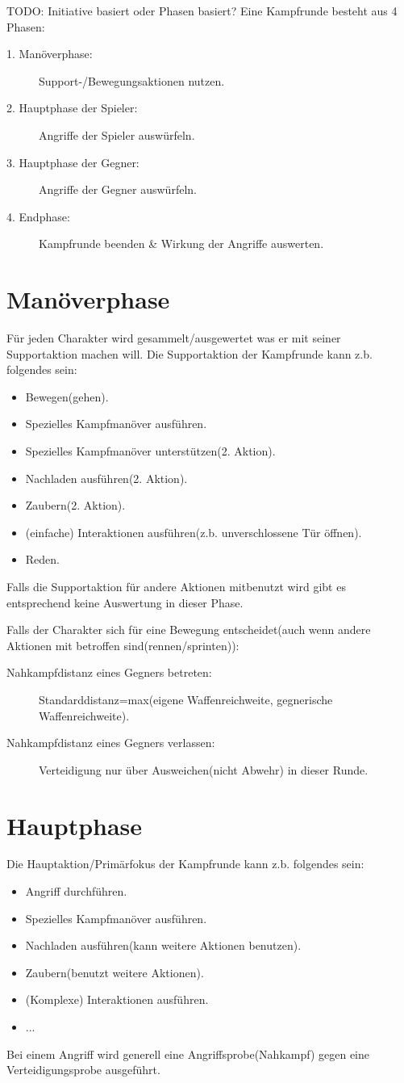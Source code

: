 TODO: Initiative basiert oder Phasen basiert?
Eine Kampfrunde besteht aus 4 Phasen:
\begin{description}
\item[1. Manöverphase:] Support-/Bewegungsaktionen nutzen.
\item[2. Hauptphase der Spieler:] Angriffe der Spieler auswürfeln.
\item[3. Hauptphase der Gegner:] Angriffe der Gegner auswürfeln.
\item[4. Endphase:] Kampfrunde beenden \& Wirkung der Angriffe auswerten.
\end{description}
\section{Manöverphase}
Für jeden Charakter wird gesammelt/ausgewertet was er mit seiner Supportaktion machen will.
Die Supportaktion der Kampfrunde kann z.b. folgendes sein:
\begin{itemize}
\item Bewegen(gehen).
\item Spezielles Kampfmanöver ausführen.
\item Spezielles Kampfmanöver unterstützen(2. Aktion).
\item Nachladen ausführen(2. Aktion).
\item Zaubern(2. Aktion).
\item (einfache) Interaktionen ausführen(z.b. unverschlossene Tür öffnen).
\item Reden.
\end{itemize}
Falls die Supportaktion für andere Aktionen mitbenutzt wird gibt es entsprechend keine Auswertung in dieser Phase.

Falls der Charakter sich für eine Bewegung entscheidet(auch wenn andere Aktionen mit betroffen sind(rennen/sprinten)):
\begin{description}
\item[Nahkampfdistanz eines Gegners betreten:] Standarddistanz=max(eigene Waffenreichweite, gegnerische Waffenreichweite).
\item[Nahkampfdistanz eines Gegners verlassen:] Verteidigung nur über Ausweichen(nicht Abwehr) in dieser Runde.
\end{description}

\section{Hauptphase}
Die Hauptaktion/Primärfokus der Kampfrunde kann z.b. folgendes sein:
\begin{itemize}
\item Angriff durchführen.
\item Spezielles Kampfmanöver ausführen.
\item Nachladen ausführen(kann weitere Aktionen benutzen).
\item Zaubern(benutzt weitere Aktionen).
\item (Komplexe) Interaktionen ausführen.
\item ...
\end{itemize}
Bei einem Angriff wird generell eine Angriffsprobe(Nahkampf) gegen eine Verteidigungsprobe ausgeführt.

